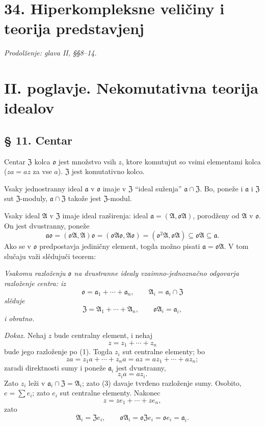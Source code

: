 \documentclass[11pt]{article}
\providecommand{\ma}{\mathfrak{a}}
\providecommand{\mA}{\mathfrak{A}}
\providecommand{\mZ}{\mathfrak{Z}}
\providecommand{\mo}{\mathfrak{o}}
\begin{document}
\section*{34. Hiperkompleksne veličiny i teorija predstavjenj}
\emph{Prodolženje: glava II, §§8--14.}

\section*{II. poglavje. Nekomutativna teorija idealov}

\subsection*{§ 11. Centar}

Centar $\mZ$ kolca $\mo$ jest množstvo vsih $z$, ktore komutujut so vsimi elementami kolca ($za=az$ za vse $a$). $\mZ$ jest komutativno kolco.

Vsaky jednostranny ideal $\ma$ v $\mo$ imaje v $\mZ$ ``ideal suženja'' $\ma\cap\mZ$. Bo, poneže i $\ma$ i $\mZ$ sut $\mZ$-moduly, $\ma\cap\mZ$ takože jest $\mZ$-modul.

Vsaky ideal $\mA$ v $\mZ$ imaje ideal razširenja: ideal $\ma=(\mA,\mo\mA)$, porodženy od $\mA$ v $\mo$. On jest dvustranny, poneže
\[
        \ma\mo=(\mo\mA,\mA)\mo=(\mo\mA\mo,\mA\mo)
        =(\mo^2\mA,\mo\mA)\subseteq\mo\mA\subseteq\ma.
\]
Ako se v $\mo$ predpostavja jediničny element, togda možno pisati $\ma=\mo\mA$. V tom slučaju važi slědujuči teorem:

\emph{Vsakomu razloženju $\mo$ na dvustranne idealy vzaimno-jednoznačno odgovarja razloženje centra: iz}
\begin{equation}
        \mo=\ma_1+\cdots+\ma_n,
        \qquad \mA_i=\ma_i\cap\mZ                         \tag{1}
\end{equation}
\emph{slěduje}
\begin{equation}
        \mZ=\mA_1+\cdots+\mA_n,
        \qquad \mo\mA_i=\ma_i,                              \tag{2}
\end{equation}
\emph{i obratno.}

\emph{Dokaz.} Nehaj $z$ bude centralny element, i nehaj
\begin{equation}
        z=z_1+\cdots+z_n                                    \tag{3}
\end{equation}
bude jego razloženje po (1). Togda $z_i$ sut centralne elementy; bo
\[
        za=z_1a+\cdots+z_na=az=az_1+\cdots+az_n;
\]
zaradi direktnosti sumy i poneže $\ma_i$ jest dvustranny,
\[
        z_i a=az_i.
\]
Zato $z_i$ leži v $\ma_i\cap\mZ=\mA_i$; zato (3) davaje tvrđeno razloženje sumy. Osobito, $e=\sum e_i$; zato $e_i$ sut centralne elementy. Nakonec
\[
        z=ze_1+\cdots+ze_n,
\]
zato
\[
        \mA_i=\mZ e_i,
        \qquad
        \mo\mA_i=\mo\mZ e_i=\mo e_i=\ma_i.
\]
\end{document}
